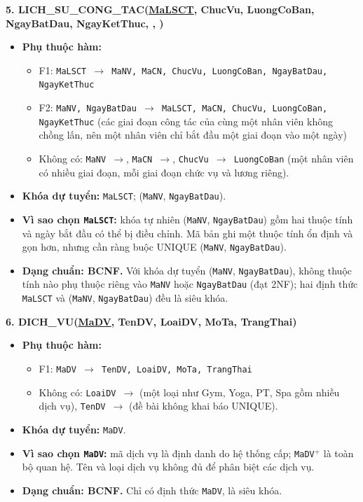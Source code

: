 \documentclass[11pt, a4paper]{article}
\newcommand{\pk}[1]{\bgroup\ULdepth=1.8pt\uline{#1}\egroup}
\newcommand{\fk}[1]{\bgroup\ULdepth=1.8pt\dashuline{#1}\egroup}
\begin{document}
\textbf{5. LICH\_SU\_CONG\_TAC(\pk{MaLSCT}, ChucVu, LuongCoBan, NgayBatDau, NgayKetThuc, \fk{MaNV}, \fk{MaCN})}
\begin{itemize}
    \item \textbf{Phụ thuộc hàm:}
    \begin{itemize}
        \item F1: \texttt{MaLSCT $\rightarrow$ MaNV, MaCN, ChucVu, LuongCoBan, NgayBatDau, NgayKetThuc}
        \item F2: \texttt{MaNV, NgayBatDau $\rightarrow$ MaLSCT, MaCN, ChucVu, LuongCoBan, NgayKetThuc} (các giai đoạn công tác của cùng một nhân viên không chồng lấn, nên một nhân viên chỉ bắt đầu một giai đoạn vào một ngày)
        \item Không có: \texttt{MaNV $\rightarrow$}, \texttt{MaCN $\rightarrow$}, \texttt{ChucVu $\rightarrow$ LuongCoBan} (một nhân viên có nhiều giai đoạn, mỗi giai đoạn chức vụ và lương riêng).
    \end{itemize}
    \item \textbf{Khóa dự tuyển:} \texttt{MaLSCT}; (\texttt{MaNV}, \texttt{NgayBatDau}).
    \item \textbf{Vì sao chọn \texttt{MaLSCT}:} khóa tự nhiên (\texttt{MaNV}, \texttt{NgayBatDau}) gồm hai thuộc tính và ngày bắt đầu có thể bị điều chỉnh. Mã bản ghi một thuộc tính ổn định và gọn hơn, nhưng cần ràng buộc UNIQUE (\texttt{MaNV}, \texttt{NgayBatDau}).
    \item \textbf{Dạng chuẩn: BCNF.} Với khóa dự tuyển (\texttt{MaNV}, \texttt{NgayBatDau}), không thuộc tính nào phụ thuộc riêng vào \texttt{MaNV} hoặc \texttt{NgayBatDau} (đạt 2NF); hai định thức \texttt{MaLSCT} và (\texttt{MaNV}, \texttt{NgayBatDau}) đều là siêu khóa.
\end{itemize}

\textbf{6. DICH\_VU(\pk{MaDV}, TenDV, LoaiDV, MoTa, TrangThai)}
\begin{itemize}
    \item \textbf{Phụ thuộc hàm:}
    \begin{itemize}
        \item F1: \texttt{MaDV $\rightarrow$ TenDV, LoaiDV, MoTa, TrangThai}
        \item Không có: \texttt{LoaiDV $\rightarrow$} (một loại như Gym, Yoga, PT, Spa gồm nhiều dịch vụ), \texttt{TenDV $\rightarrow$} (đề bài không khai báo UNIQUE).
    \end{itemize}
    \item \textbf{Khóa dự tuyển:} \texttt{MaDV}.
    \item \textbf{Vì sao chọn \texttt{MaDV}:} mã dịch vụ là định danh do hệ thống cấp; \texttt{MaDV$^+$} là toàn bộ quan hệ. Tên và loại dịch vụ không đủ để phân biệt các dịch vụ.
    \item \textbf{Dạng chuẩn: BCNF.} Chỉ có định thức \texttt{MaDV}, là siêu khóa.
\end{itemize}
\end{document}
